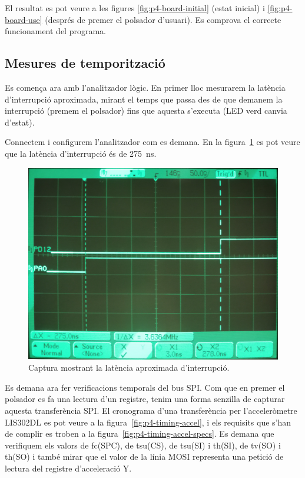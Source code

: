 El resultat es pot veure a les figures \ref{fig:p4-board-initial} (estat inicial) i
\ref{fig:p4-board-use} (després de premer el polsador d'usuari).
Es comprova el correcte funcionament del programa.


\subsection{Mesures de temporització}

Es comença ara amb l'analitzador lògic. En primer lloc mesurarem la latència d'interrupció
aproximada, mirant el temps que passa des de que demanem la interrupció (premem el polsador) fins que
aquesta s'executa (LED verd canvia d'estat).

Connectem i configurem l'analitzador com es demana.
En la figura~\ref{fig:p4-analyzer-latency} es pot veure que la latència d'interrupció és de
\SI{275}{\nano\second}.

\begin{figure}
  \begin{center}
    \includegraphics[width=1\columnwidth]{../photos/analyzer/interrupt-latency}
  \end{center}
  \caption{ \label{fig:p4-analyzer-latency} Captura mostrant la latència aproximada d'interrupció. }
\end{figure}

Es demana ara fer verificacions temporals del bus SPI. Com que en premer el polsador es fa
una lectura d'un registre, tenim una forma senzilla de capturar aquesta transferència SPI.
El cronograma d'una transferència per l'acceleròmetre LIS302DL es pot veure a la
figura~\ref{fig:p4-timing-accel}, i els requisits que s'han de complir es troben a la
figura~\ref{fig:p4-timing-accel-specs}. Es demana que verifiquem els valors de \textsf{fc(SPC)},
de \textsf{tsu(CS)}, de \textsf{tsu(SI)} i \textsf{th(SI)}, de \textsf{tv(SO)} i \textsf{th(SO)}
i també mirar que el valor de la línia \textsf{MOSI} representa una petició de lectura
del registre d'acceleració Y.

